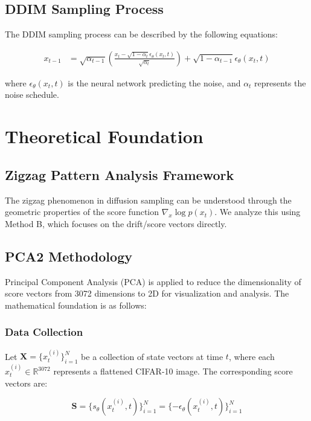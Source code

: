 \documentclass[11pt]{article}
\begin{document}
\subsection{DDIM Sampling Process}
The DDIM sampling process can be described by the following equations:

\begin{align}
x_{t-1} &= \sqrt{\alpha_{t-1}} \left( \frac{x_t - \sqrt{1-\alpha_t} \epsilon_\theta(x_t, t)}{\sqrt{\alpha_t}} \right) + \sqrt{1-\alpha_{t-1}} \epsilon_\theta(x_t, t)
\end{align}

where $\epsilon_\theta(x_t, t)$ is the neural network predicting the noise, and $\alpha_t$ represents the noise schedule.

\section{Theoretical Foundation}

\subsection{Zigzag Pattern Analysis Framework}
The zigzag phenomenon in diffusion sampling can be understood through the geometric properties of the score function $\nabla_x \log p(x_t)$. We analyze this using Method B, which focuses on the drift/score vectors directly.

\subsection{PCA2 Methodology}
Principal Component Analysis (PCA) is applied to reduce the dimensionality of score vectors from 3072 dimensions to 2D for visualization and analysis. The mathematical foundation is as follows:

\subsubsection{Data Collection}
Let $\mathbf{X} = \{x_t^{(i)}\}_{i=1}^{N}$ be a collection of state vectors at time $t$, where each $x_t^{(i)} \in \mathbb{R}^{3072}$ represents a flattened CIFAR-10 image. The corresponding score vectors are:

\begin{equation}
\mathbf{S} = \{s_\theta(x_t^{(i)}, t)\}_{i=1}^{N} = \{-\epsilon_\theta(x_t^{(i)}, t)\}_{i=1}^{N}
\end{equation}
\end{document}

